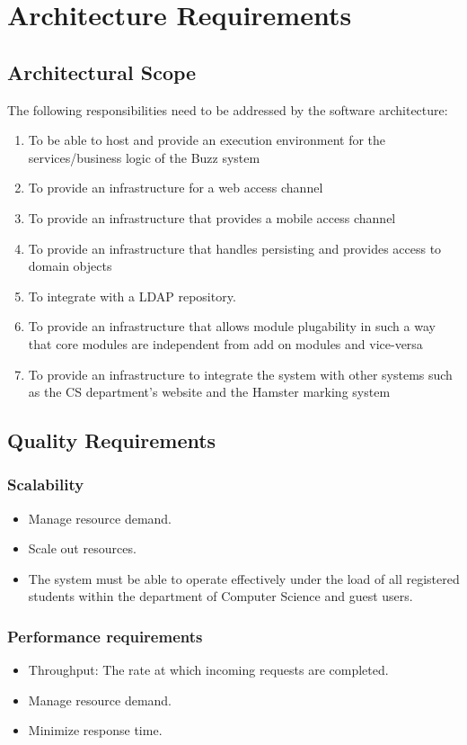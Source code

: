 \documentclass[12pt, oneside]{article}
\begin{document}
\section{Architecture Requirements}
	\subsection{Architectural Scope}
	The following responsibilities need to be addressed by the software architecture:
	\begin{enumerate}
		\item To be able to host and provide an execution environment for the services/business logic of the Buzz system
		\item To provide an infrastructure for a web access channel
		\item To provide an infrastructure that provides a mobile access channel
		\item To provide an infrastructure that handles persisting and provides access to domain objects
		\item To integrate with a LDAP repository.
		\item To provide an infrastructure that allows module plugability in such a way that core modules are independent from add on modules and vice-versa
		\item To provide an infrastructure to integrate the system with other systems such as the CS department's website and the Hamster marking system
	\end{enumerate}
	\subsection{Quality Requirements}
		\subsubsection{Scalability}
			\begin{itemize} 
				\item Manage resource demand.
				\item Scale out resources.
				\item The system must be able to operate effectively under the load of all registered students within the department of Computer Science and guest users.
			\end{itemize}
			
		\subsubsection{Performance requirements}
			\begin{itemize}
				\item Throughput: The rate at which incoming requests are completed.
				\item Manage resource demand.
				\item Minimize response time.
			\end{itemize}
\end{document}
